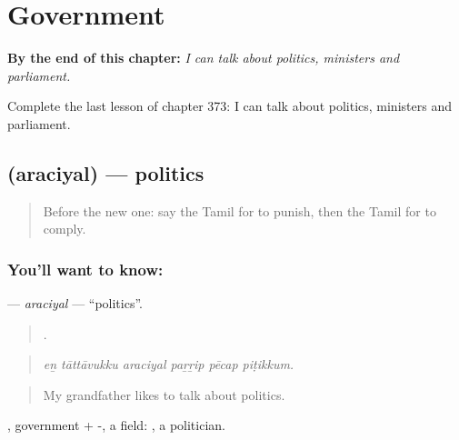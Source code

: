 
\chapter{Government}
\label{ch:ta-government}

\begin{chapteropening}
\textbf{By the end of this chapter:} \emph{I can talk about politics, ministers and parliament.}

Complete the last lesson of chapter 373: I can talk about politics, ministers and parliament.
\end{chapteropening}

\section[\texorpdfstring{\ta{அரசியல்} (araciyal)}{அரசியல் (araciyal)}]{ (araciyal) — politics}

\label{lesson:TA-C373-araciyal}



\begin{quote}
Before the new one: say the Tamil for to punish, then the Tamil for to comply.
\end{quote}

\subsection*{You'll want to know: }
\textbf{} — \emph{araciyal} — \textquotedblleft{}politics\textquotedblright{}.

\begin{quote}
     .
\end{quote}

\begin{quote}
\emph{eṉ tāttāvukku araciyal paṟṟip pēcap piṭikkum.}
\end{quote}

\begin{quote}
My grandfather likes to talk about politics.
\end{quote}

, government + -, a field: , a politician.

